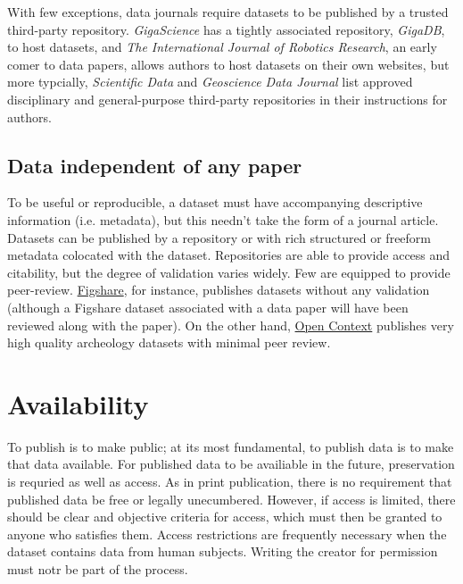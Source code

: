 \documentclass[10pt,a4paper,twocolumn]{article}
\begin{document}
With few exceptions, data journals require datasets to be published by a trusted third-party repository. 
\emph{GigaScience} has a tightly associated repository, \emph{GigaDB}, to host datasets, and \emph{The International Journal of Robotics Research}\cite{international_journal_of_robotics_research}, an early comer to data papers\cite{newman_data_2009}, allows authors to host datasets on their own websites, but more typcially, \emph{Scientific Data} and \emph{Geoscience Data Journal} list approved disciplinary and general-purpose third-party repositories in their instructions for authors.

\subsection*{Data independent of any paper}\label{paper-independent-data}

To be useful or reproducible, a dataset must have accompanying descriptive information (i.e. metadata), but this needn't take the form of a journal article. 
Datasets can be published by a repository or with rich structured or freeform metadata colocated with the dataset.
Repositories are able to provide access and citability, but the degree of validation varies widely. 
Few are equipped to provide peer-review. \href{http://figshare.com/}{Figshare}, for instance, publishes datasets without any validation (although a Figshare dataset associated with a data paper will have been reviewed along with the paper). 
On the other hand, \href{http://opencontext.org/}{Open Context} publishes very high quality archeology datasets with minimal peer review.




\section*{Availability}\label{availability}

To publish is to make public; at its most fundamental, to publish data is to make that data available. 
For published data to be availiable in the future, preservation is requried as well as access.
As in print publication, there is no requirement that published data be free or legally unecumbered.
However, if access is limited, there should be clear and objective criteria for access, which must then be granted to anyone who satisfies them.
Access restrictions are frequently necessary when the dataset contains data from human subjects.
Writing the creator for permission must notr be part of the process.
\end{document}
